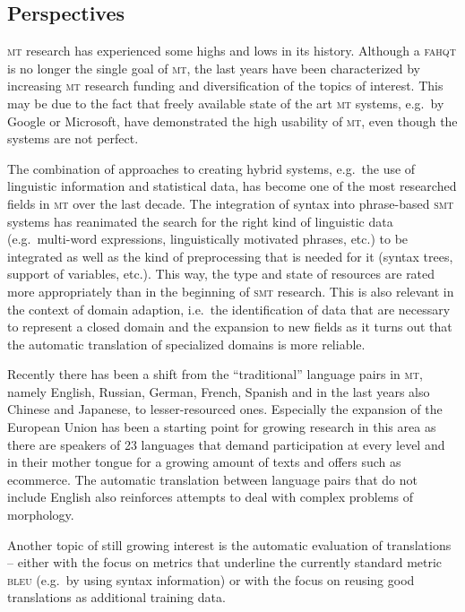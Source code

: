 \documentclass[output=paper]{LSP/langsci}
\begin{document}
\subsection{Perspectives}\label{sec:stein:3.5}

\textsc{mt} research has experienced some highs and lows in its history. Although a \textsc{fahqt} is no longer the single goal of \textsc{mt}, the last years have been characterized by increasing \textsc{mt} research funding and diversification of the topics of interest. This may be due to the fact that freely available state of the art \textsc{mt} systems, e.g.\ by Google or Microsoft, have demonstrated the high usability of \textsc{mt}, even though the systems are not perfect. 

The combination of approaches to creating hybrid systems, e.g.\ the use of linguistic information and statistical data, has become one of the most researched fields in \textsc{mt} over the last decade. The integration of syntax into phrase-based \textsc{smt} systems has reanimated the search for the right kind of linguistic data (e.g.\ multi-word expressions, linguistically motivated phrases, etc.) to be integrated as well as the kind of preprocessing that is needed for it (syntax trees, support of variables, etc.). This way, the type and state of resources are rated more appropriately than in the beginning of \textsc{smt} research. This is also relevant in the context of domain adaption, i.e.\ the identification of data that are necessary to represent a closed domain and the expansion to new fields as it turns out that the automatic translation of specialized domains is more reliable. 

Recently there has been a shift from the ``traditional'' language pairs in \textsc{mt}, namely English, Russian, German, French, Spanish and in the last years also Chinese and Japanese, to lesser-resourced ones. Especially the expansion of the European Union has been a starting point for growing research in this area as there are speakers of 23 languages that demand participation at every level and in their mother tongue for a growing amount of texts and offers such as ecommerce. The automatic translation between language pairs that do not include English also reinforces attempts to deal with complex problems of morphology. 

Another topic of still growing interest is the automatic evaluation of translations -- either with the focus on metrics that underline the currently standard metric \textsc{bleu} (e.g.\ by using syntax information) or with the focus on reusing good translations as additional training data. 

\sloppy
\printbibliography[heading=subbibliography,notkeyword=this]
\end{document}
